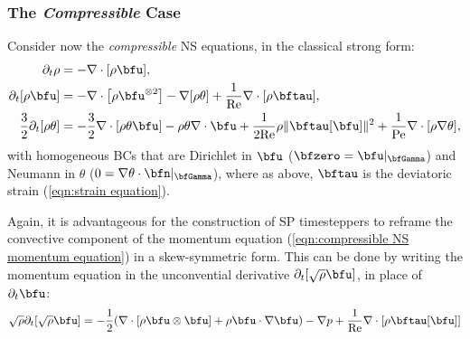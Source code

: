 \subsubsection*{The \emph{Compressible} Case}
    Consider now the \emph{compressible} NS equations, in the classical strong form:
    \begin{align}
                \partial_{t}\rho  &=  - \nabla\cdot[\rho\bfu],  \label{eqn:compressible NS mass equation}  \\
          \partial_{t}[\rho\bfu]  &=  - \nabla\cdot\left[\rho\bfu^{\otimes 2}\right] - \nabla[\rho\theta] + \frac{1}{\rmRe}\nabla\cdot[\rho\bftau],  \label{eqn:compressible NS momentum equation}  \\
        \frac{3}{2}\partial_{t}[\rho\theta]  &=  - \frac{3}{2}\nabla\cdot[\rho\theta\bfu] - \rho\theta\nabla\cdot\bfu + \frac{1}{2\rmRe}\rho\|\bftau[\bfu]\|^{2} + \frac{1}{\rmPe}\nabla\cdot[\rho\nabla\theta],  \label{eqn:compressible NS energy equation}
    \end{align}
    with homogeneous BCs that are Dirichlet in $\bfu$ ($\bfzero  =  \bfu|_{\bfGamma}$) and Neumann in $\theta$ ($0  =  \nabla\theta\cdot\bfn|_{\bfGamma}$), where as above, $\bftau$ is the deviatoric strain (\ref{eqn:strain equation}).

    Again, it is advantageous for the construction of SP timesteppers to reframe the convective component of the momentum equation (\ref{eqn:compressible NS momentum equation}) in a skew-symmetric form. This can be done by writing the momentum equation in the unconvential derivative $\partial_{t}[\sqrt{\rho}\bfu]$, in place of $\partial_{t}\bfu$:
    \begin{equation}
        \sqrt{\rho}\partial_{t}[\sqrt{\rho}\bfu]  =  - \frac{1}{2}(\nabla\cdot\left[\rho\bfu\otimes\bfu\right] + \rho\bfu\cdot\nabla\bfu) - \nabla p + \frac{1}{\rmRe}\nabla\cdot[\rho\bftau[\bfu]]  \label{eqn:compressible NS skew-symmetric momentum equation}
    \end{equation}


